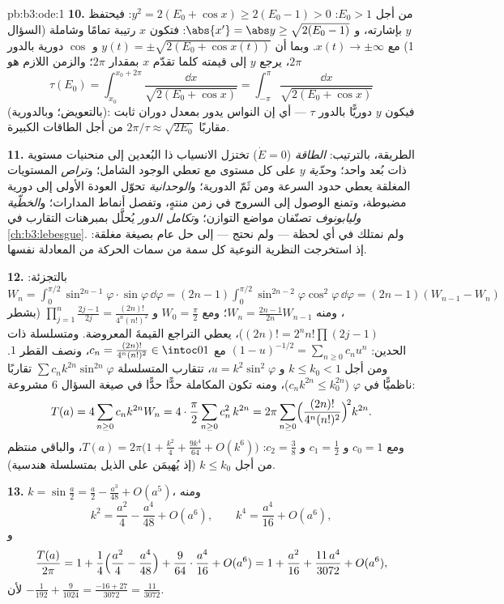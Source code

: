 \begin{solution}{pb:b3:ode:1}
\textbf{10.} من أجل $E_0 > 1$: $y^2 = 2(E_0 + \cos x) \geq
2(E_0 - 1) > 0$: فيحتفظ $y$ بإشارته،
و $\abs{x'} = \abs y
\geq \sqrt{2(E_0 - 1)}$: فتكون $x$ رتيبة تمامًا وشاملة (السؤال 1) مع $x(t) \to \pm\infty$.
وبما أن $y(t) =
\pm\sqrt{2(E_0 + \cos x(t))}$ و $\cos$ دورية بالدور $2\pi$، يرجع $y$ إلى
قيمته كلما تقدّم $x$ بمقدار $2\pi$؛ والزمن اللازم هو
\[
\tau(E_0) = \int_{x_0}^{x_0 + 2\pi}\frac{\dd
x}{\sqrt{2(E_0 + \cos x)}} =
\int_{-\pi}^{\pi}\frac{\dd x}{\sqrt{2(E_0 + \cos x)}}
\]
(بالتعويض؛ وبالدورية): فيكون $y$ دوريًّا بالدور $\tau$ --- أي
إن النواس يدور بمعدل دوران ثابت مقاربًا $2\pi/\tau \approx \sqrt{2E_0}$ من أجل الطاقات
الكبيرة.

\textbf{11.} الطريقة، بالترتيب: \emph{الطاقة} ($\dot E =
0$) تختزل
الانسياب ذا البُعدين إلى منحنيات مستوية ذات بُعد واحد؛
و\emph{حدّية} $y$ على كل مستوى مع  تعطي
الوجود الشامل؛ و\emph{تراص} المستويات المغلقة يعطي حدود السرعة
ومن ثَمّ الدورية؛ و\emph{الوحدانية} تحوّل العودة الأولى إلى
دورية مضبوطة، وتمنع الوصول إلى السروج في زمن منتهٍ، وتفصل
أنماط المدارات؛ و\emph{الخطّية وليابونوف} تصنّفان مواضع
التوازن؛ و\emph{تكامل الدور} يُحلَّل بمبرهنات التقارب في
\cref{ch:b3:lebesgue}. ولم نمتلك في أي لحظة --- ولم نحتج --- إلى حل عام
بصيغة مغلقة: إذ استخرجت النظرية النوعية كل سمة من سمات الحركة
من المعادلة نفسها.

\textbf{12.} بالتجزئة: $W_n = \int_0^{\pi/2}\sin^{2n-1}\varphi
\cdot\sin\varphi\,\dd\varphi = (2n-1)\int_0^{\pi/2}
\sin^{2n-2}\varphi\cos^2\varphi\,\dd\varphi = (2n-1)(W_{n-1}
- W_n)$، ومنه $W_n = \frac{2n-1}{2n}W_{n-1}$؛ ومع $W_0 =
\frac\pi2$
و $\prod_{j=1}^n\frac{2j-1}{2j} =
\frac{(2n)!}{4^n(n!)^2}$ (بشطر $(2n)! = 2^nn!\prod(2j-1)$)، يعطي التراجع القيمةَ المعروضة.
ومتسلسلة ذات الحدين: $(1 -
u)^{-1/2} = \sum_{n\geq0}c_nu^n$ مع $c_n =
\frac{(2n)!}{4^n(n!)^2} \in \intoc01$، ونصف القطر $1$. ومن
أجل $k
\leq k_0 < 1$ و $u = k^2\sin^2\varphi$، تتقارب المتسلسلة $\sum c_nk^{2n}\sin^{2n}\varphi$ تقاربًا
ناظميًّا في $\varphi$ ($c_nk^{2n} \leq k_0^{2n}$)، ومنه تكون المكاملة حدًّا حدًّا
في صيغة السؤال 6 مشروعة:
\[
T(a) = 4\sum_{n\geq0}c_nk^{2n}W_n
= 4\cdot\frac\pi2\sum_{n\geq0}c_n^2\,k^{2n}
= 2\pi\sum_{n\geq0}
\Bigl(\frac{(2n)!}{4^n(n!)^2}\Bigr)^{\!2}k^{2n} .
\]
ومع $c_0 = 1$ و $c_1 = \frac12$ و $c_2 = \frac38$: $T(a) =
2\pi\bigl(1 + \frac{k^2}4 + \frac{9k^4}{64} + O(k^6)\bigr)$،
والباقي منتظم من أجل $k \leq k_0$ (إذ يُهيمَن على الذيل
بمتسلسلة هندسية).

\textbf{13.} $k = \sin\frac a2 = \frac a2 - \frac{a^3}{48} +
O(a^5)$، ومنه
\[
k^2 = \frac{a^2}4 - \frac{a^4}{48} + O(a^6),
\qquad
k^4 = \frac{a^4}{16} + O(a^6) ,
\]
و
\[
\frac{T(a)}{2\pi} = 1 + \frac14\Bigl(\frac{a^2}4 -
\frac{a^4}{48}\Bigr) + \frac9{64}\cdot\frac{a^4}{16} +
O(a^6)
= 1 + \frac{a^2}{16} + \frac{11\,a^4}{3072} + O(a^6) ,
\]
لأن $-\frac1{192} + \frac9{1024} = \frac{-16 + 27}{3072}
= \frac{11}{3072}$.


\end{solution}
